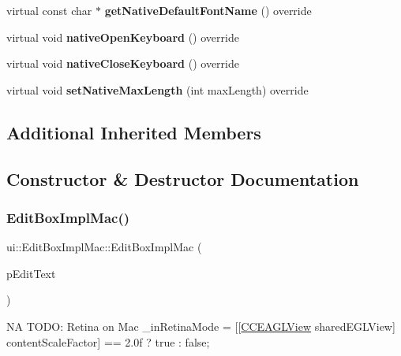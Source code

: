 \begin{DoxyCompactItemize}
virtual const char $\ast$ {\bfseries get\+Native\+Default\+Font\+Name} () override
\item 
\mbox{\label{classui_1_1EditBoxImplMac_a81f69dc24493bf7f260406750b8c022f}} 
virtual void {\bfseries native\+Open\+Keyboard} () override
\item 
\mbox{\label{classui_1_1EditBoxImplMac_ade6f6a18c13cf246074df61648e2f8aa}} 
virtual void {\bfseries native\+Close\+Keyboard} () override
\item 
\mbox{\label{classui_1_1EditBoxImplMac_a1c14c2aeadaffbd37c8c50545c1f9920}} 
virtual void {\bfseries set\+Native\+Max\+Length} (int max\+Length) override
\end{DoxyCompactItemize}
\subsection*{Additional Inherited Members}


\subsection{Constructor \& Destructor Documentation}
\mbox{\label{classui_1_1EditBoxImplMac_ab297af48ff18727aa143ffcdc72c446f}} 
\subsubsection{\texorpdfstring{Edit\+Box\+Impl\+Mac()}{EditBoxImplMac()}\hspace{0.1cm}{\footnotesize\ttfamily [1/2]}}
{\footnotesize\ttfamily ui\+::\+Edit\+Box\+Impl\+Mac\+::\+Edit\+Box\+Impl\+Mac (\begin{DoxyParamCaption}\item[{\hyperlink{classui_1_1EditBox}{Edit\+Box} $\ast$}]{p\+Edit\+Text }\end{DoxyParamCaption})}

NA T\+O\+DO\+: Retina on Mac \+\_\+in\+Retina\+Mode = \mbox{[}\mbox{[}\hyperlink{interfaceCCEAGLView}{C\+C\+E\+A\+G\+L\+View} shared\+E\+G\+L\+View\mbox{]} content\+Scale\+Factor\mbox{]} == 2.\+0f ? true \+: false;

